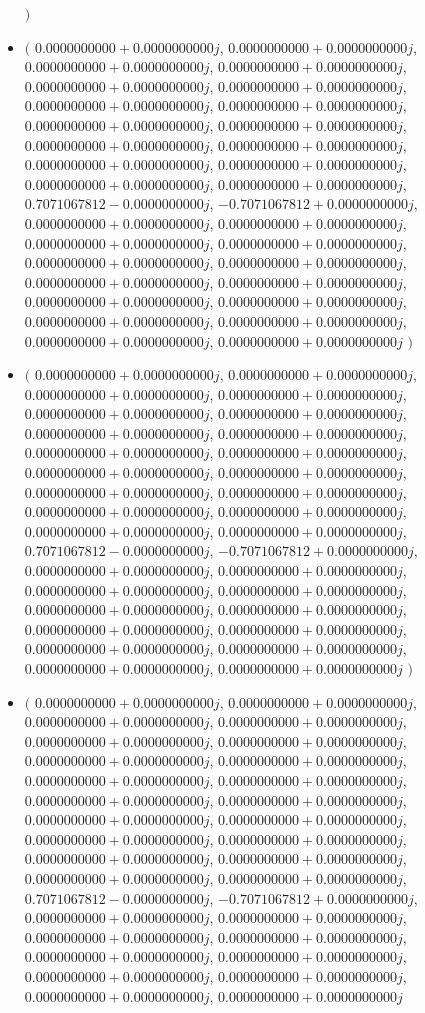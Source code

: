 \documentclass[14pt,a4paper]{article}
\begin{document}
\begin{itemize}
$\big)$
\item
$\big($
$0.0000000000+0.0000000000j$, $0.0000000000+0.0000000000j$, $0.0000000000+0.0000000000j$, $0.0000000000+0.0000000000j$, $0.0000000000+0.0000000000j$, $0.0000000000+0.0000000000j$, $0.0000000000+0.0000000000j$, $0.0000000000+0.0000000000j$, $0.0000000000+0.0000000000j$, $0.0000000000+0.0000000000j$, $0.0000000000+0.0000000000j$, $0.0000000000+0.0000000000j$, $0.0000000000+0.0000000000j$, $0.0000000000+0.0000000000j$, $0.0000000000+0.0000000000j$, $0.0000000000+0.0000000000j$, $0.7071067812-0.0000000000j$, $-0.7071067812+0.0000000000j$, $0.0000000000+0.0000000000j$, $0.0000000000+0.0000000000j$, $0.0000000000+0.0000000000j$, $0.0000000000+0.0000000000j$, $0.0000000000+0.0000000000j$, $0.0000000000+0.0000000000j$, $0.0000000000+0.0000000000j$, $0.0000000000+0.0000000000j$, $0.0000000000+0.0000000000j$, $0.0000000000+0.0000000000j$, $0.0000000000+0.0000000000j$, $0.0000000000+0.0000000000j$, $0.0000000000+0.0000000000j$, $0.0000000000+0.0000000000j$
$\big)$
\item
$\big($
$0.0000000000+0.0000000000j$, $0.0000000000+0.0000000000j$, $0.0000000000+0.0000000000j$, $0.0000000000+0.0000000000j$, $0.0000000000+0.0000000000j$, $0.0000000000+0.0000000000j$, $0.0000000000+0.0000000000j$, $0.0000000000+0.0000000000j$, $0.0000000000+0.0000000000j$, $0.0000000000+0.0000000000j$, $0.0000000000+0.0000000000j$, $0.0000000000+0.0000000000j$, $0.0000000000+0.0000000000j$, $0.0000000000+0.0000000000j$, $0.0000000000+0.0000000000j$, $0.0000000000+0.0000000000j$, $0.0000000000+0.0000000000j$, $0.0000000000+0.0000000000j$, $0.7071067812-0.0000000000j$, $-0.7071067812+0.0000000000j$, $0.0000000000+0.0000000000j$, $0.0000000000+0.0000000000j$, $0.0000000000+0.0000000000j$, $0.0000000000+0.0000000000j$, $0.0000000000+0.0000000000j$, $0.0000000000+0.0000000000j$, $0.0000000000+0.0000000000j$, $0.0000000000+0.0000000000j$, $0.0000000000+0.0000000000j$, $0.0000000000+0.0000000000j$, $0.0000000000+0.0000000000j$, $0.0000000000+0.0000000000j$
$\big)$
\item
$\big($
$0.0000000000+0.0000000000j$, $0.0000000000+0.0000000000j$, $0.0000000000+0.0000000000j$, $0.0000000000+0.0000000000j$, $0.0000000000+0.0000000000j$, $0.0000000000+0.0000000000j$, $0.0000000000+0.0000000000j$, $0.0000000000+0.0000000000j$, $0.0000000000+0.0000000000j$, $0.0000000000+0.0000000000j$, $0.0000000000+0.0000000000j$, $0.0000000000+0.0000000000j$, $0.0000000000+0.0000000000j$, $0.0000000000+0.0000000000j$, $0.0000000000+0.0000000000j$, $0.0000000000+0.0000000000j$, $0.0000000000+0.0000000000j$, $0.0000000000+0.0000000000j$, $0.0000000000+0.0000000000j$, $0.0000000000+0.0000000000j$, $0.7071067812-0.0000000000j$, $-0.7071067812+0.0000000000j$, $0.0000000000+0.0000000000j$, $0.0000000000+0.0000000000j$, $0.0000000000+0.0000000000j$, $0.0000000000+0.0000000000j$, $0.0000000000+0.0000000000j$, $0.0000000000+0.0000000000j$, $0.0000000000+0.0000000000j$, $0.0000000000+0.0000000000j$, $0.0000000000+0.0000000000j$, $0.0000000000+0.0000000000j$

\end{itemize}
\end{document}
